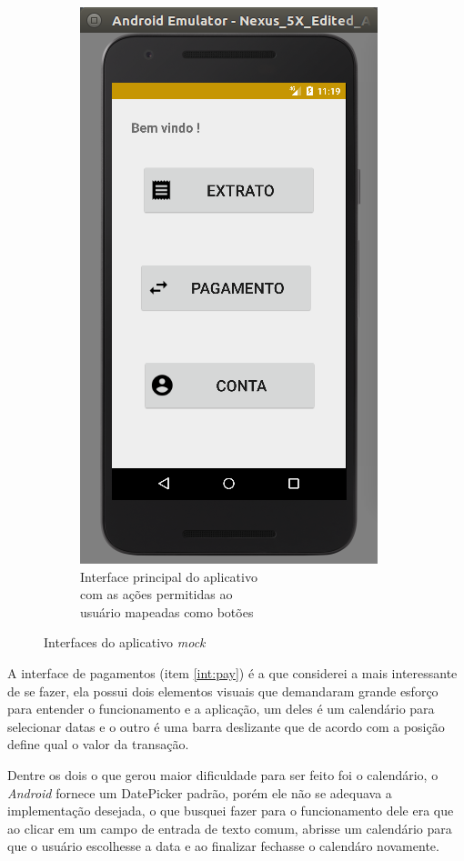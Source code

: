 \documentclass[hidelinks,12pt]{article}
\begin{document}
\begin{figure}[H]
\begin{subfigure}{0.5\textwidth}
		\includegraphics[scale=0.5]{int:main}
		\caption{Interface principal do aplicativo\\\hspace{\textwidth}com as a\c{c}\~oes permitidas ao\\\hspace{\textwidth}usu\'ario mapeadas como bot\~oes}
		\label{int:main}
	\end{subfigure}
	\caption{Interfaces do aplicativo \textit{mock}}
	\label{loginmain}
\end{figure}

A interface de pagamentos (item \ref{int:pay}) \'e a que considerei a mais interessante de se fazer, ela possui dois elementos visuais que demandaram grande esfor\c{c}o para entender o funcionamento e a aplica\c{c}\~ao, um deles \'e um calend\'ario para selecionar datas e o outro \'e uma barra deslizante que de acordo com a posi\c{c}\~ao define qual o valor da transa\c{c}\~ao.

Dentre os dois o que gerou maior dificuldade para ser feito foi o calend\'ario, o \textit{Android} fornece um DatePicker padr\~ao, por\'em ele n\~ao se adequava a implementa\c{c}\~ao desejada, o que busquei fazer para o funcionamento dele era que ao clicar em um campo de entrada de texto comum, abrisse um calend\'ario para que o usu\'ario escolhesse a data e ao finalizar fechasse o calend\'aro novamente.
\end{document}
